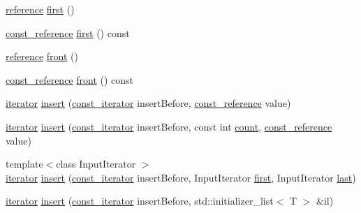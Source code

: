 \begin{DoxyCompactItemize}
\item 
\hyperlink{classprism_1_1_list_a87113fe9cf2580e395e3d9f2962f4e81}{reference} \hyperlink{classprism_1_1_list_a403997c37906888fb96e612557fc7a05}{first} ()
\item 
\hyperlink{classprism_1_1_list_a31c013c3f9135c28c3c4bf489fbeb322}{const\+\_\+reference} \hyperlink{classprism_1_1_list_a40d014004df46b9997ce81bbc490dac0}{first} () const 
\item 
\hyperlink{classprism_1_1_list_a87113fe9cf2580e395e3d9f2962f4e81}{reference} \hyperlink{classprism_1_1_list_a389a92c786597aa0fc0918189491cd64}{front} ()
\item 
\hyperlink{classprism_1_1_list_a31c013c3f9135c28c3c4bf489fbeb322}{const\+\_\+reference} \hyperlink{classprism_1_1_list_a3082476c9130719533c961b46e09762d}{front} () const 
\item 
\hyperlink{classprism_1_1_list_aa95cb21a8754f91406f53bd0315513af}{iterator} \hyperlink{classprism_1_1_list_a313a60ae219854247f2dfa464ac30b8e}{insert} (\hyperlink{classprism_1_1_list_a82987892223347376baec1efd26aa655}{const\+\_\+iterator} insert\+Before, \hyperlink{classprism_1_1_list_a31c013c3f9135c28c3c4bf489fbeb322}{const\+\_\+reference} value)
\item 
\hyperlink{classprism_1_1_list_aa95cb21a8754f91406f53bd0315513af}{iterator} \hyperlink{classprism_1_1_list_ab92c8e2076807ea6ecc2fce099e6a3e7}{insert} (\hyperlink{classprism_1_1_list_a82987892223347376baec1efd26aa655}{const\+\_\+iterator} insert\+Before, const int \hyperlink{classprism_1_1_list_a7dbdab274aecfdc26b7d208f80772a78}{count}, \hyperlink{classprism_1_1_list_a31c013c3f9135c28c3c4bf489fbeb322}{const\+\_\+reference} value)
\item 
{\footnotesize template$<$class Input\+Iterator $>$ }\\\hyperlink{classprism_1_1_list_aa95cb21a8754f91406f53bd0315513af}{iterator} \hyperlink{classprism_1_1_list_a79c26970ac36446b3b9321ee55d869a1}{insert} (\hyperlink{classprism_1_1_list_a82987892223347376baec1efd26aa655}{const\+\_\+iterator} insert\+Before, Input\+Iterator \hyperlink{classprism_1_1_list_a403997c37906888fb96e612557fc7a05}{first}, Input\+Iterator \hyperlink{classprism_1_1_list_a674a1f2acb2580b63ec54964334721dd}{last})
\item 
\hyperlink{classprism_1_1_list_aa95cb21a8754f91406f53bd0315513af}{iterator} \hyperlink{classprism_1_1_list_a1548ebff73252fd1fb2663320ebddf8a}{insert} (\hyperlink{classprism_1_1_list_a82987892223347376baec1efd26aa655}{const\+\_\+iterator} insert\+Before, std\+::initializer\+\_\+list$<$ T $>$ \&il)

\end{DoxyCompactItemize}
